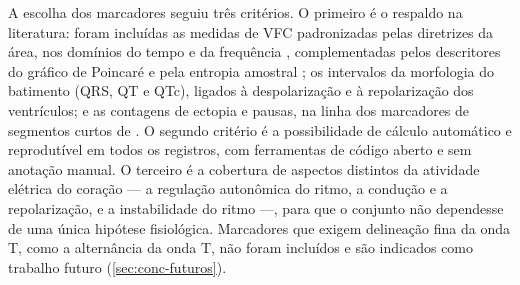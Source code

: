 A escolha dos marcadores seguiu três critérios. O primeiro é o respaldo na
literatura: foram incluídas as medidas de \gls{VFC} padronizadas pelas
diretrizes da área, nos domínios do tempo e da frequência
\cite{taskforce1996heart}, complementadas pelos descritores do gráfico de
Poincaré \cite{brennan2001poincare} e pela entropia amostral
\cite{richman2000physiological}; os intervalos da morfologia do batimento
(QRS, QT e QTc), ligados à despolarização e à repolarização dos ventrículos;
e as contagens de ectopia e pausas, na linha dos marcadores de segmentos
curtos de . O segundo critério é a
possibilidade de cálculo automático e reprodutível em todos os registros,
com ferramentas de código aberto \cite{makowski2021neurokit2} e sem anotação
manual. O terceiro é a cobertura de aspectos distintos da atividade elétrica
do coração --- a regulação autonômica do ritmo, a condução e a repolarização,
e a instabilidade do ritmo ---, para que o conjunto não dependesse de uma
única hipótese fisiológica. Marcadores que exigem delineação fina da onda T,
como a alternância da onda T, não foram incluídos e são indicados como
trabalho futuro (\autoref{sec:conc-futuros}).

